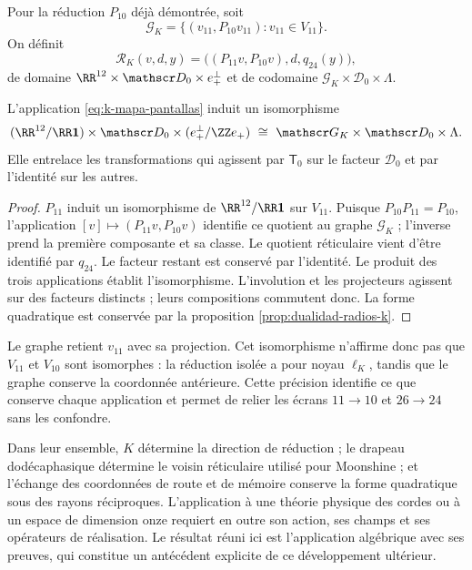 Pour la réduction \(P_{10}\) déjà démontrée, soit
\[
 \mathscr G_K=\{(v_{11},P_{10}v_{11}):v_{11}\in V_{11}\}.
\]
On définit
\begin{equation}
 \mathcal R_K(v,d,y)
 =\bigl((P_{11}v,P_{10}v),d,q_{24}(y)\bigr),
 \label{eq:k-mapa-pantallas}
\end{equation}
de domaine \(\RR^{12}\times\mathscr D_0\times e_+^\perp\)
et de codomaine \(\mathscr G_K\times\mathscr D_0\times\Lambda\).

\begin{theorem}
\label{thm:k-pantallas-coordinadas}
L'application \eqref{eq:k-mapa-pantallas} induit un isomorphisme
\[
 (\RR^{12}/\RR\mathbf1)\times\mathscr D_0
       \times(e_+^\perp/\ZZ e_+)
 \ \cong\ \mathscr G_K\times\mathscr D_0\times\Lambda.
\]
Elle entrelace les transformations qui agissent par \(\mathsf T_0\)
sur le facteur \(\mathscr D_0\) et par l'identité sur les autres.
\end{theorem}
\begin{proof}
\(P_{11}\) induit un isomorphisme de \(\RR^{12}/\RR\mathbf1\)
sur \(V_{11}\). Puisque \(P_{10}P_{11}=P_{10}\), l'application
\([v]\mapsto(P_{11}v,P_{10}v)\) identifie ce quotient au
graphe \(\mathscr G_K\) ; l'inverse prend la première composante
et sa classe. Le quotient réticulaire vient d'être identifié par
\(q_{24}\). Le facteur restant est conservé par l'identité.
Le produit des trois applications établit l'isomorphisme.
L'involution et les projecteurs agissent sur des facteurs distincts ;
leurs compositions commutent donc. La forme quadratique est conservée
par la proposition \ref{prop:dualidad-radios-k}.
\end{proof}

Le graphe retient \(v_{11}\) avec sa projection. Cet
isomorphisme n'affirme donc pas que \(V_{11}\) et \(V_{10}\) sont isomorphes :
la réduction isolée a pour noyau \(\ell_K\), tandis que le graphe
conserve la coordonnée antérieure. Cette précision identifie ce que conserve
chaque application et permet de relier les écrans \(11\to10\) et
\(26\to24\) sans les confondre.

Dans leur ensemble, \(K\) détermine la direction de réduction ; le drapeau
dodécaphasique détermine le voisin réticulaire utilisé pour Moonshine ;
et l'échange des coordonnées de route et de mémoire conserve la
forme quadratique sous des rayons réciproques. L'application à une théorie
physique des cordes ou à un espace de dimension onze requiert en outre
son action, ses champs et ses opérateurs de réalisation. Le résultat réuni
ici est l'application algébrique avec ses preuves, qui constitue un
antécédent explicite de ce développement ultérieur.
